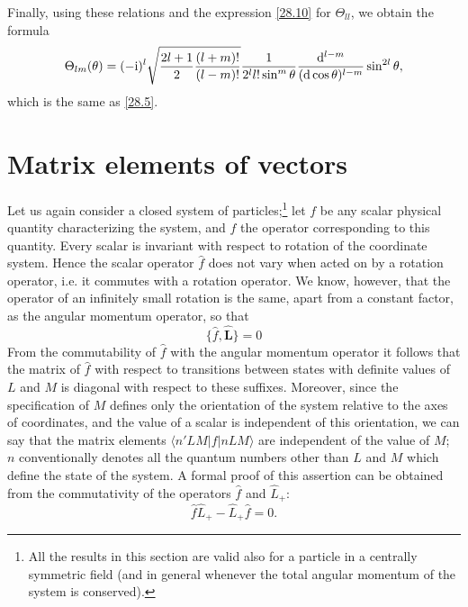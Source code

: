 Finally, using these relations and the expression \eqref{28.10} for $\Theta_{ll}$, we obtain the formula
\begin{equation}\label{28.11}
\Theta_{lm}(\theta)=(-\mathrm{i})^l\sqrt{\frac{2l+1}{2}\frac{(l+m)!}{(l-m)!}}\frac{1}{2^ll!\sin^m\theta}\frac{\mathrm{d}^{l-m}}{(\mathrm{d}\cos\theta)^{l-m}}\sin^{2l}\theta,
\end{equation}
which is the same as \eqref{28.5}.





\section{Matrix elements of vectors}\label{Matrix elements of vectors}


Let us again consider a closed system of particles;\footnote{All the results in this section are valid also for a particle in a centrally symmetric field (and in general whenever the total angular momentum of the system is conserved).} let $ f $ be any scalar physical quantity characterizing the system, and $\hat{f}$ the operator corresponding to this quantity. Every scalar is invariant with respect to rotation of the coordinate system. Hence the scalar operator $\hat{f}$ does not vary when acted on by a rotation operator, i.e. it commutes with a rotation operator. We know, however, that the operator of an infinitely small rotation is the same, apart from a constant factor, as the angular momentum operator, so that
\begin{equation}\label{29.1}
\{\hat{f},\hat{\bm{L}} \}=0
\end{equation}
From the commutability of $\hat{f}$ with the angular momentum operator it follows that the matrix of $\hat{f}$ with respect to transitions between states with definite values of $ L $ and $ M $ is diagonal with respect to these suffixes. Moreover, since the specification of $ M $ defines only the orientation of the system relative to the axes of coordinates, and the value of a scalar is independent of this orientation, we can say that the matrix elements $ \langle n'LM|f|nLM\rangle $ are independent of the value of $ M $; $ n $ conventionally denotes all the quantum numbers other than $ L $ and $ M $ which define the state of the system. A formal proof of this assertion can be obtained from the commutativity of the operators $\hat{f}$ and $ \hat{L}_+ $:
\begin{equation}\label{29.2}
\hat{f}\hat{L}_+-\hat{L}_+\hat{f}=0.
\end{equation}
